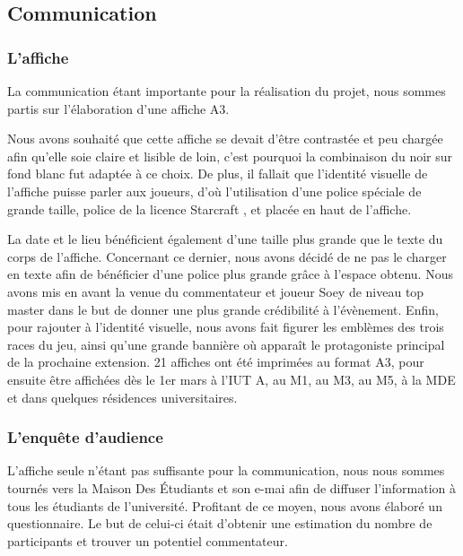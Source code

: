 \subsection{Communication}%
\label{sub:communication}

\subsubsection{L'affiche}%
\label{ssub:l_affiche}

La communication étant importante pour la réalisation du projet, nous sommes partis sur l'élaboration
d'une affiche A3.

Nous avons souhaité que cette affiche se devait d’être contrastée et peu chargée afin qu’elle soie
claire et lisible de loin, c’est pourquoi la combinaison du noir sur fond blanc fut adaptée à ce choix.
De plus, il fallait que l’identité visuelle de l’affiche puisse parler aux joueurs, d’où l’utilisation
d’une police spéciale de grande taille, police de la licence \og Starcraft \fg{}, et placée en haut de l’affiche.

La date et le lieu bénéficient également d’une taille plus grande que le texte du corps de l’affiche.
Concernant ce dernier, nous avons décidé de ne pas le charger en texte afin de bénéficier d’une police
plus grande grâce à l’espace obtenu.
Nous avons mis en avant la venue du commentateur et joueur Soey  de niveau \og top master \fg{}  dans le but
de donner une plus grande crédibilité à l’évènement.
Enfin, pour rajouter à l’identité visuelle, nous avons fait figurer  les emblèmes des trois races du jeu,
ainsi qu’une grande bannière où apparaît le protagoniste principal de la prochaine extension.
21 affiches ont été imprimées au format A3, pour ensuite être affichées dès le 1er mars à l’IUT A, au M1,
au M3, au M5, à la MDE et dans quelques résidences universitaires.

\subsubsection{L'enquête d'audience}%
\label{ssub:l_enquete_d_audience}

L'affiche seule n'étant pas suffisante pour la communication, nous nous sommes tournés vers la
Maison Des Étudiants et son e-mai afin de diffuser l'information à tous les étudiants de l'université.
Profitant de ce moyen, nous avons élaboré un questionnaire. Le but de celui-ci était d'obtenir une estimation
du nombre de participants et trouver un potentiel commentateur.

